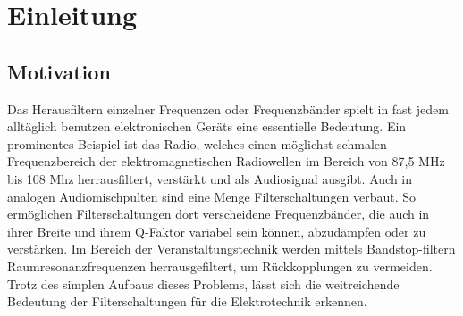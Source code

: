 \section{Einleitung}

\subsection{Motivation}
Das Herausfiltern einzelner Frequenzen oder Frequenzbänder spielt in fast jedem alltäglich benutzen elektronischen Geräts eine essentielle Bedeutung. Ein prominentes Beispiel ist das Radio, welches einen möglichst schmalen Frequenzbereich der elektromagnetischen Radiowellen im Bereich von 87,5 MHz bis 108 Mhz \cite{radio} herrausfiltert, verstärkt und als Audiosignal ausgibt.
Auch in analogen Audiomischpulten sind eine Menge Filterschaltungen verbaut. So ermöglichen Filterschaltungen dort verscheidene Frequenzbänder, die auch in ihrer Breite und ihrem Q-Faktor variabel sein können, abzudämpfen oder zu verstärken. Im Bereich der Veranstaltungstechnik werden mittels Bandstop-filtern Raumresonanzfrequenzen herrausgefiltert, um Rückkopplungen zu vermeiden. Trotz des simplen Aufbaus dieses Problems, lässt sich die weitreichende Bedeutung der Filterschaltungen für die Elektrotechnik erkennen.

